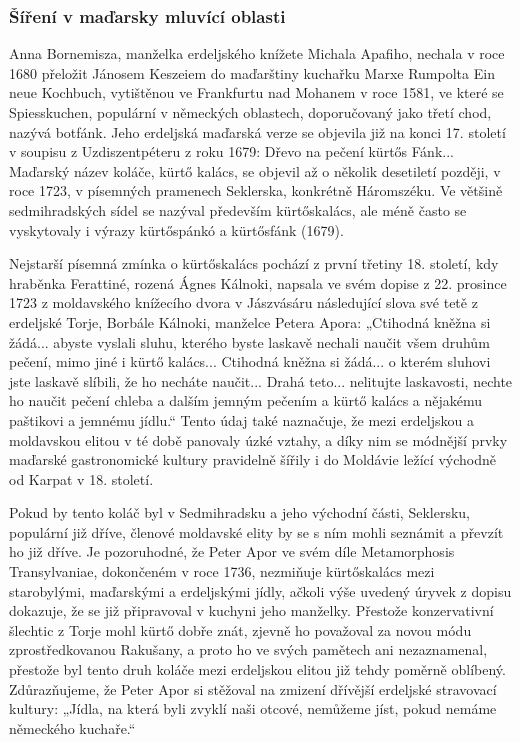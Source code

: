 \subsubsection{Šíření v maďarsky mluvící
oblasti}\label{250319-1326}

Anna Bornemisza, manželka erdeljského knížete Michala Apafiho, nechala v
roce 1680 přeložit Jánosem Keszeiem do maďarštiny kuchařku Marxe
Rumpolta Ein neue Kochbuch, vytištěnou ve Frankfurtu nad Mohanem v roce
1581, ve které se Spiesskuchen, populární v německých oblastech,
doporučovaný jako třetí chod, nazývá botfánk. Jeho erdeljská maďarská
verze se objevila již na konci 17. století v soupisu z Uzdiszentpéteru z
roku 1679: Dřevo na pečení kürtős Fánk... Maďarský název koláče, kürtő
kalács, se objevil až o několik desetiletí později, v roce 1723, v
písemných pramenech Seklerska, konkrétně Háromszéku. Ve většině
sedmihradských sídel se nazýval především kürtőskalács, ale méně často
se vyskytovaly i výrazy kürtőspánkó a kürtősfánk (1679).

Nejstarší písemná zmínka o kürtőskalács pochází z první třetiny 18.
století, kdy hraběnka Ferattiné, rozená Ágnes Kálnoki, napsala ve svém
dopise z 22. prosince 1723 z moldavského knížecího dvora v Jászvásáru
následující slova své tetě z erdeljské Torje, Borbále Kálnoki, manželce
Petera Apora: „Ctihodná kněžna si žádá... abyste vyslali sluhu, kterého
byste laskavě nechali naučit všem druhům pečení, mimo jiné i kürtő
kalács... Ctihodná kněžna si žádá... o kterém sluhovi jste laskavě
slíbili, že ho necháte naučit... Drahá teto... nelitujte laskavosti,
nechte ho naučit pečení chleba a dalším jemným pečením a kürtő kalács a
nějakému paštikovi a jemnému jídlu.`` Tento údaj také naznačuje, že mezi
erdeljskou a moldavskou elitou v té době panovaly úzké vztahy, a díky
nim se módnější prvky maďarské gastronomické kultury pravidelně šířily i
do Moldávie ležící východně od Karpat v 18. století.

Pokud by tento koláč byl v Sedmihradsku a jeho východní části,
Seklersku, populární již dříve, členové moldavské elity by se s ním
mohli seznámit a převzít ho již dříve. Je pozoruhodné, že Peter Apor ve
svém díle Metamorphosis Transylvaniae, dokončeném v roce 1736, nezmiňuje
kürtőskalács mezi starobylými, maďarskými a erdeljskými jídly, ačkoli
výše uvedený úryvek z dopisu dokazuje, že se již připravoval v kuchyni
jeho manželky. Přestože konzervativní šlechtic z Torje mohl kürtő dobře
znát, zjevně ho považoval za novou módu zprostředkovanou Rakušany, a
proto ho ve svých pamětech ani nezaznamenal, přestože byl tento druh
koláče mezi erdeljskou elitou již tehdy poměrně oblíbený. Zdůrazňujeme,
že Peter Apor si stěžoval na zmizení dřívější erdeljské stravovací
kultury: „Jídla, na která byli zvyklí naši otcové, nemůžeme jíst, pokud
nemáme německého kuchaře.``

